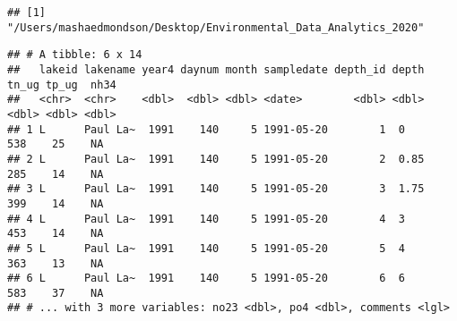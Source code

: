 \documentclass[]{article}
\newenvironment{Shaded}{\begin{snugshade}}{\end{snugshade}}
\newcommand{\CommentTok}[1]{\textcolor[rgb]{0.56,0.35,0.01}{\textit{#1}}}
\newcommand{\DataTypeTok}[1]{\textcolor[rgb]{0.13,0.29,0.53}{#1}}
\newcommand{\KeywordTok}[1]{\textcolor[rgb]{0.13,0.29,0.53}{\textbf{#1}}}
\newcommand{\NormalTok}[1]{#1}
\newcommand{\OperatorTok}[1]{\textcolor[rgb]{0.81,0.36,0.00}{\textbf{#1}}}
\newcommand{\StringTok}[1]{\textcolor[rgb]{0.31,0.60,0.02}{#1}}
\begin{document}
\begin{Shaded}
\end{Shaded}

\begin{verbatim}
## [1] "/Users/mashaedmondson/Desktop/Environmental_Data_Analytics_2020"
\end{verbatim}

\begin{Shaded}
\end{Shaded}

\begin{verbatim}
## # A tibble: 6 x 14
##   lakeid lakename year4 daynum month sampledate depth_id depth tn_ug tp_ug  nh34
##   <chr>  <chr>    <dbl>  <dbl> <dbl> <date>        <dbl> <dbl> <dbl> <dbl> <dbl>
## 1 L      Paul La~  1991    140     5 1991-05-20        1  0      538    25    NA
## 2 L      Paul La~  1991    140     5 1991-05-20        2  0.85   285    14    NA
## 3 L      Paul La~  1991    140     5 1991-05-20        3  1.75   399    14    NA
## 4 L      Paul La~  1991    140     5 1991-05-20        4  3      453    14    NA
## 5 L      Paul La~  1991    140     5 1991-05-20        5  4      363    13    NA
## 6 L      Paul La~  1991    140     5 1991-05-20        6  6      583    37    NA
## # ... with 3 more variables: no23 <dbl>, po4 <dbl>, comments <lgl>
\end{verbatim}

\begin{Shaded}
\end{Shaded}
\end{document}
